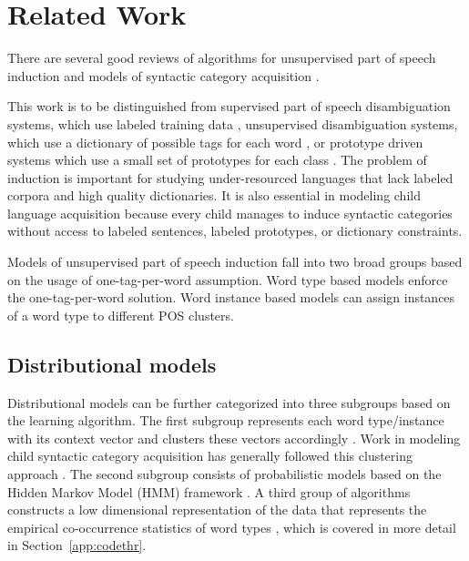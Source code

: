 \section{Related Work}
\label{sec:related}
There are several good reviews of algorithms for unsupervised
part of speech induction
\cite{Christodoulopoulos:2010:TDU:1870658.1870714,Gao:2008:CBE:1613715.1613761}
and models of syntactic category acquisition \cite{ambridge2011child}.

This work is to be distinguished from supervised part of speech
disambiguation systems, which use labeled training data
\cite{Toutanova:2003:FPT:1073445.1073478}, unsupervised disambiguation
systems, which use a dictionary of possible tags for each word
\cite{yatbaz-yuret:2010:POSTERS}, or prototype driven systems
which use a small set of prototypes for each class
\cite{Haghighi:2006:PLS:1220835.1220876}.  The problem of induction is
important for studying under-resourced languages that lack labeled
corpora and high quality dictionaries.  It is also essential in
modeling child language acquisition because every child manages to
induce syntactic categories without access to labeled sentences,
labeled prototypes, or dictionary constraints.

Models of unsupervised part of speech induction fall into two broad groups
based on the usage of one-tag-per-word assumption.  Word type based models
enforce the one-tag-per-word solution.  Word instance based models can assign
instances of a word type to different POS clusters.

\subsection{Distributional models}

Distributional models can be further categorized into three subgroups
based on the learning algorithm.  The first subgroup represents each
word type/instance with its context vector and clusters these vectors
accordingly \cite{Schutze:1995:DPT:976973.976994}.  Work in modeling
child syntactic category acquisition has generally followed this
clustering approach
\cite{redington1998distributional,mintz2003frequent}.  The second
subgroup consists of probabilistic models based on the Hidden Markov
Model (HMM) framework \cite{Brown:1992:CNG:176313.176316}.  A third
group of algorithms constructs a low dimensional representation of the
data that represents the empirical co-occurrence statistics of word
types \cite{globerson2007euclidean}, which is covered in more detail
in Section~\ref{app:codethr}.

